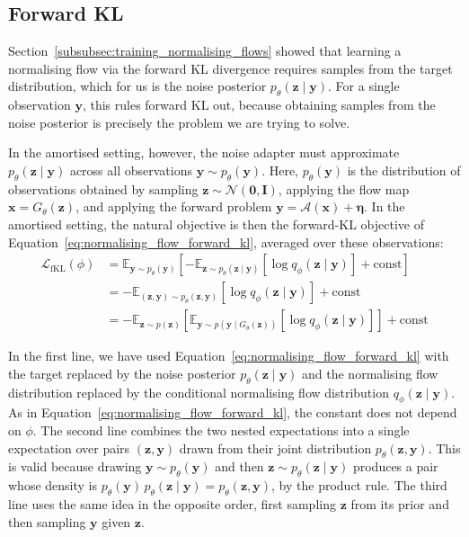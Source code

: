 \documentclass[12pt,a4paper]{report}
\begin{document}
\subsection{Forward KL}
\label{subsec:forward_kl_objective}
Section~\ref{subsubsec:training_normalising_flows} showed that learning a normalising flow via the forward KL divergence requires samples from the target distribution, which for us is the noise posterior $p_{\theta}(\mathbf{z}\mid\mathbf{y})$. For a single observation $\mathbf{y}$, this rules forward KL out, because obtaining samples from the noise posterior is precisely the problem we are trying to solve.

In the amortised setting, however, the noise adapter must approximate $p_{\theta}(\mathbf{z}\mid\mathbf{y})$ across all observations $\mathbf{y}\sim p_{\theta}(\mathbf{y})$. Here, $p_{\theta}(\mathbf{y})$ is the distribution of observations obtained by sampling $\mathbf{z}\sim\mathcal{N}(\mathbf{0},\mathbf{I})$, applying the flow map $\mathbf{x}=G_{\theta}(\mathbf{z})$, and applying the forward problem $\mathbf{y}=\mathcal{A}(\mathbf{x})+\boldsymbol{\eta}$. In the amortised setting, the natural objective is then the forward-KL objective of Equation~\ref{eq:normalising_flow_forward_kl}, averaged over these observations:
\begin{align}
\mathcal{L}_{\mathrm{fKL}}(\phi)
&=
\mathbb{E}_{\mathbf{y}\sim p_{\theta}(\mathbf{y})}
\left[
-\mathbb{E}_{\mathbf{z}\sim p_{\theta}(\mathbf{z}\mid\mathbf{y})}
\left[\log q_{\phi}(\mathbf{z}\mid\mathbf{y})\right]
+\mathrm{const}
\right]
\nonumber
\\
&=
-\mathbb{E}_{(\mathbf{z},\mathbf{y})\sim p_{\theta}(\mathbf{z},\mathbf{y})}
\left[\log q_{\phi}(\mathbf{z}\mid\mathbf{y})\right]
+\mathrm{const}
\nonumber
\\
&=
-\mathbb{E}_{\mathbf{z}\sim p(\mathbf{z})}
\left[
\mathbb{E}_{\mathbf{y}\sim p(\mathbf{y}\mid G_{\theta}(\mathbf{z}))}
\left[\log q_{\phi}(\mathbf{z}\mid\mathbf{y})\right]
\right]
+\mathrm{const}
\label{eq:fkl_objective}
\end{align}

In the first line, we have used Equation~\ref{eq:normalising_flow_forward_kl} with the target replaced by the noise posterior $p_{\theta}(\mathbf{z}\mid\mathbf{y})$ and the normalising flow distribution replaced by the conditional normalising flow distribution $q_{\phi}(\mathbf{z}\mid\mathbf{y})$. As in Equation~\ref{eq:normalising_flow_forward_kl}, the constant does not depend on $\phi$. The second line combines the two nested expectations into a single expectation over pairs $(\mathbf{z},\mathbf{y})$ drawn from their joint distribution $p_{\theta}(\mathbf{z},\mathbf{y})$. This is valid because drawing $\mathbf{y}\sim p_{\theta}(\mathbf{y})$ and then $\mathbf{z}\sim p_{\theta}(\mathbf{z}\mid\mathbf{y})$ produces a pair whose density is $p_{\theta}(\mathbf{y})\,p_{\theta}(\mathbf{z}\mid\mathbf{y})=p_{\theta}(\mathbf{z},\mathbf{y})$, by the product rule. The third line uses the same idea in the opposite order, first sampling $\mathbf{z}$ from its prior and then sampling $\mathbf{y}$ given $\mathbf{z}$.
\end{document}
